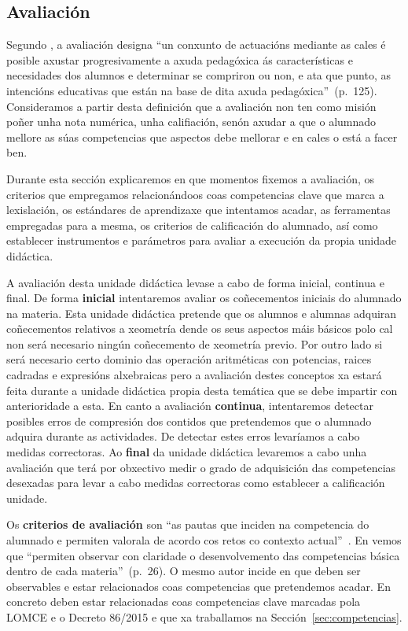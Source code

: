 \subsection{Avaliación}\label{sec:avaliacion}

Segundo , a avaliación designa ``un conxunto de actuacións mediante as cales é posible axustar progresivamente a axuda pedagóxica ás características e necesidades dos alumnos e determinar se compriron ou non, e ata que punto, as intencións educativas que están na base de dita axuda pedagóxica''~(p.~125). Consideramos a partir desta definición que a avaliación non ten como misión poñer unha nota numérica, unha califiación, senón axudar a que o alumnado mellore as súas competencias que aspectos debe mellorar e en cales o está a facer ben.

Durante esta sección explicaremos en que momentos fixemos a avaliación, os criterios que empregamos relacionándoos coas competencias clave que marca a lexislación, os estándares de aprendizaxe que intentamos acadar, as ferramentas empregadas para a mesma, os criterios de calificación do alumnado, así como establecer instrumentos e parámetros para avaliar a execución da propia unidade didáctica.

A avaliación desta unidade didáctica levase a cabo de forma inicial, continua e final. De forma \textbf{inicial} intentaremos avaliar os coñecementos iniciais do alumnado na materia. Esta unidade didáctica pretende que os alumnos e alumnas adquiran coñecementos relativos a xeometría dende os seus aspectos máis básicos polo cal non será necesario ningún coñecemento de xeometría previo. Por outro lado si será necesario certo dominio das operación aritméticas con potencias, raices cadradas e expresións alxebraicas pero a avaliación destes conceptos xa estará feita durante a unidade didáctica propia desta temática que se debe impartir con anterioridade a esta. En canto a avaliación \textbf{continua}, intentaremos detectar posibles erros de compresión dos contidos que pretendemos que o alumnado adquira durante as actividades. De detectar estes erros levaríamos a cabo medidas correctoras. Ao \textbf{final} da unidade didáctica levaremos a cabo unha avaliación que terá por obxectivo medir o grado de adquisición das competencias desexadas para levar a cabo medidas correctoras como establecer a calificación unidade.

Os \textbf{criterios de avaliación} son ``as pautas que inciden na competencia do alumnado e permiten valorala de acordo cos retos co contexto actual''~\cite[p. 134]{secdidac}. En \cite{orientacionesgobvasco} vemos que ``permiten observar con claridade o desenvolvemento das competencias básica dentro de cada materia''~(p.~26). O mesmo autor incide en que deben ser observables e estar relacionados coas competencias que pretendemos acadar. En concreto deben estar relacionadas coas competencias clave marcadas pola LOMCE e o Decreto 86/2015 e que xa traballamos na Sección~\ref{sec:competencias}.

